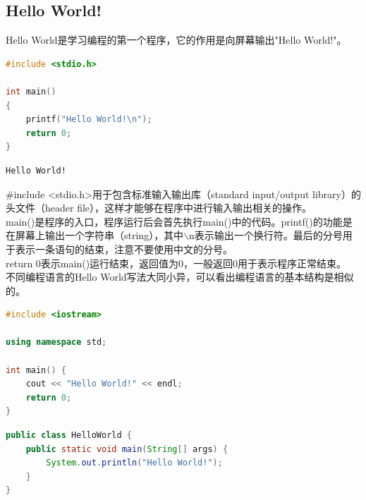 \vspace{0.5cm}

\subsection{Hello World!}

Hello World是学习编程的第一个程序，它的作用是向屏幕输出"Hello World!"。\\


\begin{lstlisting}[language=C]
#include <stdio.h>

int main()
{
	printf("Hello World!\n");
	return 0;
}
\end{lstlisting}

\begin{tcolorbox}
	\begin{verbatim}
Hello World!
	\end{verbatim}
\end{tcolorbox}

\#include <stdio.h>用于包含标准输入输出库（standard input/output library）的头文件（header file），这样才能够在程序中进行输入输出相关的操作。\\

main()是程序的入口，程序运行后会首先执行main()中的代码。printf()的功能是在屏幕上输出一个字符串（string），其中$ \backslash $n表示输出一个换行符。最后的分号用于表示一条语句的结束，注意不要使用中文的分号。\\

return 0表示main()运行结束，返回值为0，一般返回0用于表示程序正常结束。\\

不同编程语言的Hello World写法大同小异，可以看出编程语言的基本结构是相似的。\\


\begin{lstlisting}[language=C++]
#include <iostream>

using namespace std;

int main() {
	cout << "Hello World!" << endl;
	return 0;
}
\end{lstlisting}

\vspace{0.5cm}


\begin{lstlisting}[language=Java]
public class HelloWorld {
    public static void main(String[] args) {
        System.out.println("Hello World!");
    }
}
\end{lstlisting}

